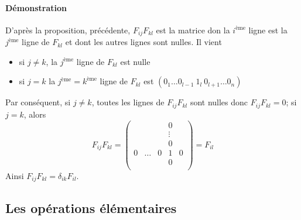 \paragraph{Démonstration} D'après la proposition, précédente, $F_{ij} F_{kl}$ est la matrice don la $i^{\text{ème}}$ ligne est la $j^{\text{ème}}$ ligne de $F_{kl}$ et dont les autres lignes sont nulles. Il vient
\begin{itemize}
  \item si $j\neq k$, la $j^{\text{ème}}$ ligne de $F_{kl}$ est nulle
  \item si $j = k$ la $j^{\text{ème}} = k^{\text{ème}}$ ligne de $F_{kl}$ est $(0_{1} \ldots 0_{l-1} ~ 1_{l} ~ 0_{l+1} \ldots 0_{n})$
\end{itemize}
Par conséquent, si $j\neq k$, toutes les lignes de $F_{ij} F_{kl}$ sont nulles donc $F_{ij} F_{kl} = 0$; si $j=k$, alors 
$$F_{ij} F_{kl} = \begin{pmatrix} 
  & & & 0 & \\
  & & & \vdots & \\
  & & & 0 & \\
  0 & \ldots & 0 & 1 & 0 \\
  & & & 0 & \\
\end{pmatrix} = F_{il}$$
Ainsi $F_{ij} F_{kl} = \delta_{ik} F_{il}$.

%
\subsection{Les opérations élémentaires}
%
